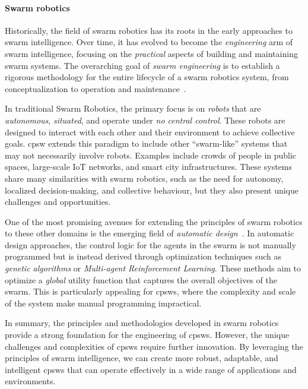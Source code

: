 \paragraph*{Swarm robotics}

Historically, 
 the field of swarm robotics has its roots in the early approaches to swarm intelligence. 
 Over time, it has evolved to become the \textit{engineering} arm of swarm intelligence, 
 focusing on the \emph{practical} aspects of building and maintaining swarm systems. 
 The overarching goal of \emph{swarm engineering} is to establish a rigorous methodology for the entire lifecycle of a swarm robotics system, 
 from conceptualization to operation and maintenance~\cite{DBLP:journals/swarm/BrambillaFBD13}.

In traditional Swarm Robotics, the primary focus is on \textit{robots} that are \emph{autonomous}, \emph{situated}, and operate under \emph{no central control}. 
 These robots are designed to interact with each other and their environment to achieve collective goals. 
 \ac{cpsw} extends this paradigm to include other ``swarm-like'' systems that may not necessarily involve robots. 
 Examples include crowds of people in public spaces, 
 large-scale IoT networks, and smart city infrastructures. 
 These systems share many similarities with swarm robotics, 
 such as the need for autonomy, 
 localized decision-making, 
 and collective behaviour, but they also present unique challenges and opportunities.

One of the most promising avenues for extending the principles of swarm robotics to these other domains is the emerging field of \textit{automatic design}~\cite{DBLP:journals/firai/FrancescaB16}. 
 In automatic design approaches, 
 the control logic for the agents in the swarm is not manually programmed but is instead derived through optimization techniques such as \textit{genetic algorithms} or \textit{Multi-agent Reinforcement Learning}.
These methods aim to optimize a \textit{global} utility function that captures the overall objectives of the swarm. 
 This is particularly appealing for \acp{cpsw}, 
 where the complexity and scale of the system make manual programming impractical.

In summary, 
 the principles and methodologies developed in swarm robotics provide a strong foundation for the engineering of \acp{cpsw}. 
 However, the unique challenges and complexities of \acp{cpsw} require further innovation. 
 By leveraging the principles of swarm intelligence,
 we can create more robust, adaptable, and intelligent \acp{cpsw} that can operate effectively in a wide range of applications and environments.

